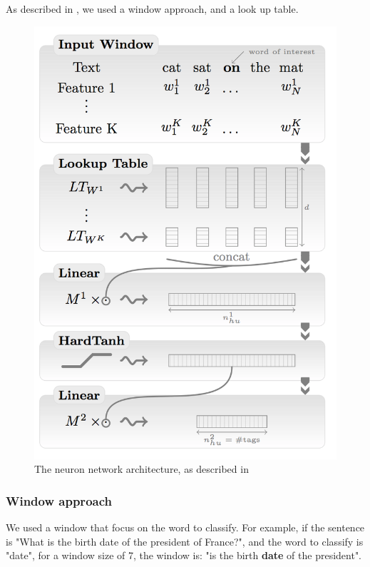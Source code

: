 As described in \cite{collobert}, we used a window approach, and a look up table.

\begin{figure}[!ht]
  \centering
  \caption{The neuron network architecture, as described in \cite{collobert}}
  \label{sandalone:tree_four}
    \includegraphics[scale=0.5]{../NLP-standalone-images/network.png}
\end{figure}

\subsubsection{Window approach}

We used a window that focus on the word to classify. For example, if the sentence is "What is the birth date of the president of France?", and the word to classify is "date", for a window size of 7, the window is: "is the birth \textbf{date} of the president".

